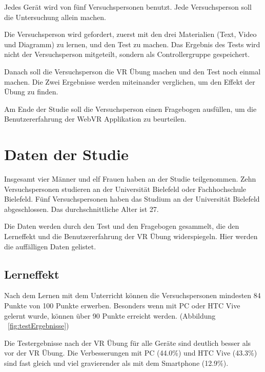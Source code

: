 Jedes Gerät wird von fünf Versuchspersonen benutzt. Jede Versuchsperson soll die Untersuchung allein machen.

Die Versuchsperson wird gefordert, zuerst mit den drei Materialien (Text, Video und Diagramm) zu lernen, und den Test zu machen. Das Ergebnis des Tests wird nicht der Versuchsperson mitgeteilt, sondern als Controllergruppe gespeichert.

Danach soll die Versuchsperson die VR Übung machen und den Test noch einmal machen. Die Zwei Ergebnisse werden miteinander verglichen, um den Effekt der Übung zu finden.

Am Ende der Studie soll die Versuchsperson einen Fragebogen ausfüllen, um die Benutzererfahrung der WebVR Applikation zu beurteilen.

\section{Daten der Studie}

Insgesamt vier Männer und elf Frauen haben an der Studie teilgenommen. Zehn Versuchspersonen studieren an der Universität Bielefeld oder Fachhochschule Bielefeld. Fünf Versuchspersonen haben das Studium an der Universität Bielefeld abgeschlossen. Das durchschnittliche Alter ist 27.

Die Daten werden durch den Test und den Fragebogen gesammelt, die den Lerneffekt und die Benutzererfahrung der VR Übung widerspiegeln. Hier werden die auffälligen Daten gelistet.

\subsection{Lerneffekt}

Nach dem Lernen mit dem Unterricht können die Versuchspersonen mindesten 84 Punkte von 100 Punkte erwerben. Besonders wenn mit PC oder HTC Vive gelernt wurde, können über 90 Punkte erreicht werden. (Abbildung ~\ref{fig:testErgebnisse})

Die Testergebnisse nach der VR Übung für alle Geräte sind deutlich besser als vor der VR Übung. Die Verbesserungen mit PC (44.0\%) und HTC Vive (43.3\%) sind fast gleich und viel gravierender als mit dem Smartphone (12.9\%).

